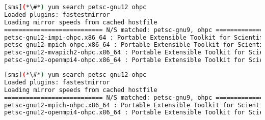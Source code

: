 \begin{lstlisting}[language=bash,keywords={}]
[sms](*\#*) yum search petsc-gnu12 ohpc
Loaded plugins: fastestmirror
Loading mirror speeds from cached hostfile
=========================== N/S matched: petsc-gnu9, ohpc ===========================
petsc-gnu12-impi-ohpc.x86_64 : Portable Extensible Toolkit for Scientific Computation
petsc-gnu12-mpich-ohpc.x86_64 : Portable Extensible Toolkit for Scientific Computation
petsc-gnu12-mvapich2-ohpc.x86_64 : Portable Extensible Toolkit for Scientific Computation
petsc-gnu12-openmpi4-ohpc.x86_64 : Portable Extensible Toolkit for Scientific Computation
\end{lstlisting}
\fi

\begin{lstlisting}[language=bash,keywords={}]
[sms](*\#*) yum search petsc-gnu12 ohpc
Loaded plugins: fastestmirror
Loading mirror speeds from cached hostfile
=========================== N/S matched: petsc-gnu9, ohpc ===========================
petsc-gnu12-mpich-ohpc.x86_64 : Portable Extensible Toolkit for Scientific Computation
petsc-gnu12-openmpi4-ohpc.x86_64 : Portable Extensible Toolkit for Scientific Computation
\end{lstlisting}
\fi

